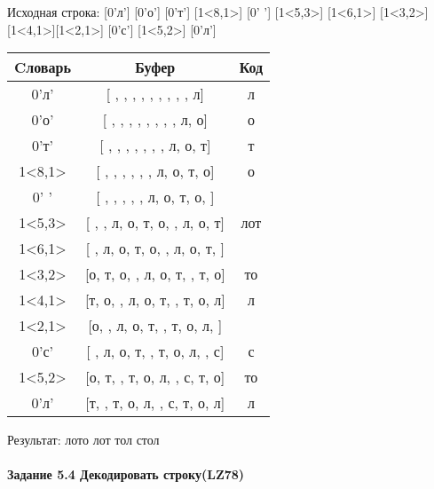 \documentclass[a4paper, 12pt]{article}
\begin{document}
Исходная строка: [0'л'] [0'о'] [0'т'] [1<8,1>] [0' '] [1<5,3>] [1<6,1>] [1<3,2>] [1<4,1>][1<2,1>] [0'с'] [1<5,2>] [0'л']\\
\begin{table}[h!]
\centering
\begin{tabular}{|c|c|c|}
\hline
 Cловарь & Буфер & Код  \\ \hline
0'л' & [ ,  ,  ,  ,  ,  ,  ,  ,  , л] & л
\\ \hline
0'о' & [ ,  ,  ,  ,  ,  ,  ,  , л, о] & о
\\ \hline
0'т' & [ ,  ,  ,  ,  ,  ,  , л, о, т] & т
\\ \hline
1<8,1> & [ ,  ,  ,  ,  ,  , л, о, т, о] & о
\\ \hline
0' ' & [ ,  ,  ,  ,  , л, о, т, о,  ] &  
\\ \hline
1<5,3> & [ ,  , л, о, т, о,  , л, о, т] & лот
\\ \hline
1<6,1> & [ , л, о, т, о,  , л, о, т,  ] &  
\\ \hline
1<3,2> & [о, т, о,  , л, о, т,  , т, о] & то
\\ \hline
1<4,1> & [т, о,  , л, о, т,  , т, о, л] & л
\\ \hline
1<2,1> & [о,  , л, о, т,  , т, о, л,  ] &  
\\ \hline
0'с' & [ , л, о, т,  , т, о, л,  , с] & с
\\ \hline
1<5,2> & [о, т,  , т, о, л,  , с, т, о] & то
\\ \hline
0'л' & [т,  , т, о, л,  , с, т, о, л] & л
\\ \hline
\end{tabular}
\end{table}

Результат: лото лот тол стол
\pagebreak
\paragraph{Задание 5.4 Декодировать строку(LZ78)\\}
\end{document}
